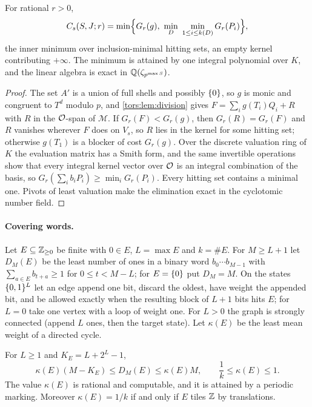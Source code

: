 \begin{theorem}\label{cost:thm:finitealg}
For rational $r>0$,
\[
 C_s(S,J;r)=\min\Bigl\{G_r(g),\ \min_{D}\ \min_{1\le i\le k(D)}G_r(P_i)\Bigr\},
\]
the inner minimum over inclusion-minimal hitting sets, an empty kernel contributing
$+\infty$. The minimum is attained by one integral polynomial over $K$, and the linear
algebra is exact in $\mathbb{Q}(\zeta_{p^{\max S}})$.
\end{theorem}

\begin{proof}
The set $A'$ is a union of full shells and possibly $\{0\}$, so $g$ is monic and congruent
to $T^d$ modulo $p$, and \cref{tors:lem:division} gives $F=\sum_ig(T_i)Q_i+R$ with $R$ in
the $\mathcal{O}$-span of $\mathcal M$. If $G_r(F)<G_r(g)$, then $G_r(R)=G_r(F)$ and $R$ vanishes
wherever $F$ does on $V_s$, so $R$ lies in the kernel for some hitting set; otherwise
$g(T_1)$ is a blocker of cost $G_r(g)$. Over the discrete valuation ring of $K$ the
evaluation matrix has a Smith form, and the same invertible operations show that every
integral kernel vector over $\mathcal{O}$ is an integral combination of the basis, so
$G_r(\sum_ib_iP_i)\ge\min_iG_r(P_i)$. Every hitting set contains a minimal one. Pivots of
least valuation make the elimination exact in the cyclotomic number field.
\end{proof}

\paragraph{Covering words.}
Let $E\subseteq\mathbb{Z}_{\ge0}$ be finite with $0\in E$, $L=\max E$ and $k=\#E$. For $M\ge L+1$ let
$D_M(E)$ be the least number of ones in a binary word $b_0\cdots b_{M-1}$ with
$\sum_{a\in E}b_{t+a}\ge1$ for $0\le t<M-L$; for $E=\{0\}$ put $D_M=M$. On the states
$\{0,1\}^L$ let an edge append one bit, discard the oldest, have weight the appended bit,
and be allowed exactly when the resulting block of $L+1$ bits hits $E$; for $L=0$ take one
vertex with a loop of weight one. For $L>0$ the graph is strongly connected (append $L$ ones,
then the target state). Let $\kappa(E)$ be the least mean weight of a directed cycle.

\begin{proposition}\label{cost:prop:words}
For $L\ge1$ and $K_E=L+2^L-1$,
\[
 \kappa(E)(M-K_E)\le D_M(E)\le\kappa(E)M,\qquad \frac1k\le\kappa(E)\le1 .
\]
The value $\kappa(E)$ is rational and computable, and it is attained by a periodic marking.
Moreover $\kappa(E)=1/k$ if and only if $E$ tiles $\mathbb{Z}$ by translations.
\end{proposition}

